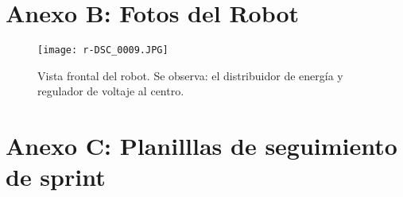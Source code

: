 

\section*{Anexo B: Fotos del Robot}

\begin{figure}
    \centering
    \texttt{[image: r-DSC\_0009.JPG]}
    \caption{Vista frontal del robot. Se observa: el distribuidor de energía y regulador de voltaje al centro.}
\end{figure}

\newpage
{}
\section*{Anexo C: Planilllas de seguimiento de sprint}







